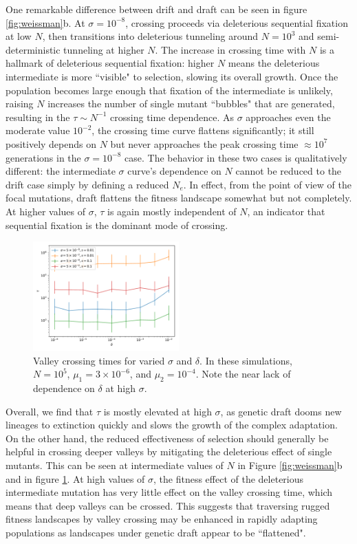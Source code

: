 \documentclass[10pt,twocolumn,twoside]{gsajnl}
\begin{document}
\begin{spacing}{1.5}
One remarkable difference between drift and draft can be seen in figure \ref{fig:weissman}b.
At $\sigma = 10^{-8}$, crossing proceeds via deleterious sequential fixation at low $N$, then transitions into deleterious tunneling around $N = 10^3$ and semi-deterministic tunneling at higher $N$.
The increase in crossing time with $N$ is a hallmark of deleterious sequential fixation: higher $N$ means the deleterious intermediate is more ``visible" to selection, slowing its overall growth.
Once the population becomes large enough that fixation of the intermediate is unlikely, raising $N$ increases the number of single mutant ``bubbles" that are generated, resulting in the $\tau \sim N^{-1}$ crossing time dependence.
As $\sigma$ approaches even the moderate value $10^{-2}$, the crossing time curve flattens significantly; it still positively depends on $N$ but never approaches the peak crossing time $\approx 10^7$ generations in the $\sigma = 10^{-8}$ case.
The behavior in these two cases is qualitatively different: the intermediate $\sigma$ curve's dependence on $N$ cannot be reduced to the drift case simply by defining a reduced $N_e$.
In effect, from the point of view of the focal mutations, draft flattens the fitness landscape somewhat but not completely.
At higher values of $\sigma$, $\tau$ is again mostly independent of $N$, an indicator that sequential fixation is the dominant mode of crossing.

\begin{figure}[t]
\includegraphics[width=0.5\textwidth]{Figures/julia_sigma_delta.pdf}
\caption{Valley crossing times for varied $\sigma$ and $\delta$. In these simulations, $N = 10^5$, $\mu_1 = 3 \times 10^{-6}$, and $\mu_2 = 10^{-4}$. Note the near lack of dependence on $\delta$ at high $\sigma$.}
\label{fig:sigma_delta}
\end{figure}

Overall, we find that $\tau$ is mostly elevated at high $\sigma$, as genetic draft dooms new lineages to extinction quickly and slows the growth of the complex adaptation.
On the other hand, the reduced effectiveness of selection should generally be helpful in crossing deeper valleys by mitigating the deleterious effect of single mutants.
This can be seen at intermediate values of $N$ in Figure \ref{fig:weissman}b and in figure \ref{fig:sigma_delta}.
At high values of $\sigma$, the fitness effect of the deleterious intermediate mutation has very little effect on the valley crossing time, which means that deep valleys can be crossed.
This suggests that traversing rugged fitness landscapes by valley crossing may be enhanced in rapidly adapting populations as landscapes under genetic draft appear to be ``flattened".


\end{spacing}
\end{document}
